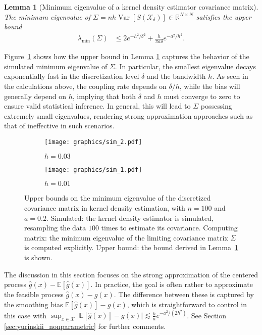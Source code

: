\documentclass[11pt,lof]{puthesis}
\newcommand{\R}{\ensuremath{\mathbb{R}}}
\newcommand{\E}{\ensuremath{\mathbb{E}}}
\newcommand{\cX}{\ensuremath{\mathcal{X}}}
\DeclareMathOperator{\Var}{Var}
\theoremstyle{break}
\newtheorem{lemma}{Lemma}[section]
\theoremstyle{proof}
\begin{document}
\begin{lemma}[Minimum eigenvalue of a
  kernel density estimator covariance matrix]%
  \label{lem:yurinskii_kde_eigenvalue}
  The minimum eigenvalue of
  $\Sigma=n h\Var[S(\cX_\delta)] \in \R^{N \times N}$
  satisfies the upper bound
  \begin{align*}
    \lambda_{\min}(\Sigma)
    &\leq
    2 e^{-h^2/\delta^2}
    + \frac{h}{\pi a \delta}
    e^{-a^2 / h^2}.
  \end{align*}
\end{lemma}
%
Figure~\ref{fig:yurinskii_min_eig} shows how the upper bound in Lemma
\ref{lem:yurinskii_kde_eigenvalue} captures the behavior of the simulated
minimum
eigenvalue of $\Sigma$. In particular, the smallest eigenvalue decays
exponentially fast in the discretization level $\delta$ and the bandwidth $h$.
As seen in the calculations above, the coupling rate depends on $\delta / h$,
while the bias will generally depend on $h$, implying that both $\delta$ and
$h$ must converge to zero to ensure valid statistical inference. In general,
this will lead to $\Sigma$ possessing extremely small eigenvalues, rendering
strong approximation approaches such as that of \citet{li2020uniform}
ineffective in such scenarios.
%
\begin{figure}[t]
  \centering
  \begin{subfigure}{0.49\textwidth}
    \centering
    \texttt{[image: graphics/sim\_2.pdf]}
    \caption{$h = 0.03$}
  \end{subfigure}
  \begin{subfigure}{0.49\textwidth}
    \centering
    \texttt{[image: graphics/sim\_1.pdf]}
    \caption{$h = 0.01$}
  \end{subfigure}
  \caption[Minimum eigenvalue of the kernel density covariance matrix]{
    Upper bounds on the minimum eigenvalue of the discretized covariance
    matrix in kernel density estimation,
    with $n=100$ and $a = 0.2$.
    Simulated: the kernel density estimator is simulated,
    resampling the data $100$ times
    to estimate its covariance.
    Computing matrix: the minimum eigenvalue of the limiting covariance
    matrix $\Sigma$ is computed explicitly.
    Upper bound: the bound derived in
    Lemma~\ref{lem:yurinskii_kde_eigenvalue}
    is shown.
  }
  \label{fig:yurinskii_min_eig}
\end{figure}

The discussion in this section focuses on the strong approximation of the
centered process $\hat g(x)-\E [ \hat g(x) ]$. In practice, the goal is often
rather to approximate the feasible process $\hat g(x)- g(x)$. The difference
between these is captured by the smoothing bias $\E [ \hat g(x) ] - g(x)$,
which is straightforward to control in this case with
$\sup_{x \in \cX} \big| \E [ \hat g(x) ] - g(x) \big|
\lesssim \frac{h}{a} e^{-a^2 / (2 h^2)}$.
See Section \ref{sec:yurinskii_nonparametric} for further
comments.
\end{document}
